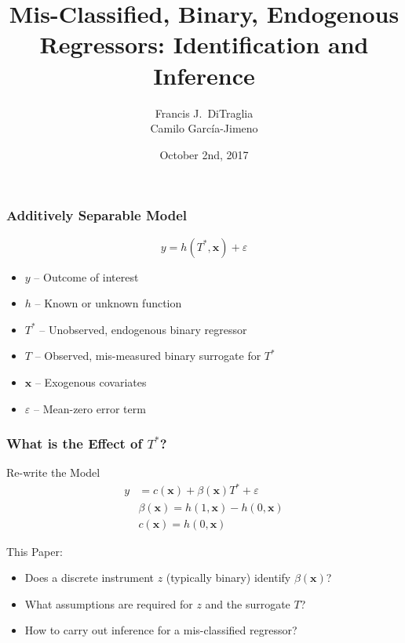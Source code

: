 \documentclass{beamer}
\title[Binary Regressors]{Mis-Classified, Binary, Endogenous Regressors: Identification and Inference}
\author[FJ DiTraglia]{Francis J.\ DiTraglia\\ Camilo Garc\'{i}a-Jimeno}
\institute{University of Pennsylvania}
\date{October 2nd, 2017}
\begin{document}
 

\begin{frame}[plain]
	\titlepage 
\end{frame} 
\begin{frame}
  \frametitle{Additively Separable Model}
\[
  y = h(T^*, \mathbf{x}) + \varepsilon
\]
\vspace{-1em}
    \begin{itemize}    
    \item $y$ -- Outcome of interest
    \item $h$ -- Known or unknown function 
    \item $T^*$ -- Unobserved, endogenous binary regressor
    \item $T$ -- Observed, mis-measured binary surrogate for $T^*$
    \item $\mathbf{x}$ -- Exogenous covariates
    \item $\varepsilon$ -- Mean-zero error term
  \end{itemize}

\end{frame}
\begin{frame}
  \frametitle{What is the Effect of $T^*$?}
 
  \begin{block}{Re-write the Model}
\begin{align*}
  y &= c(\mathbf{x}) + \beta(\mathbf{x}) T^* + \varepsilon\\
  &\beta(\mathbf{x}) = h(1,\mathbf{x}) - h(0,\mathbf{x})\\
  &c(\mathbf{x}) = h(0,\mathbf{x})
\end{align*}
  \end{block}

  \begin{alertblock}{This Paper:}
    \begin{itemize}
      \item Does a discrete instrument $z$ (typically binary) identify $\beta(\mathbf{x})$? 
      \item What assumptions are required for $z$ and the surrogate $T$?
      \item How to carry out inference for a mis-classified regressor?
    \end{itemize}
  \end{alertblock}
\end{frame}
\end{document}
